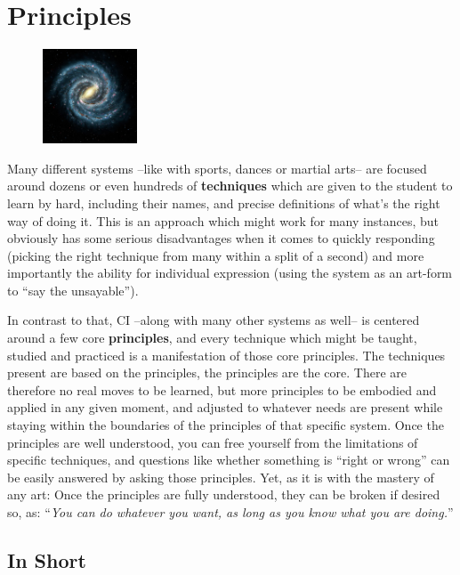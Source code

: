 \chapter{Principles}\label{ch:principles}

\begin{figure}
    \centering
    \includegraphics[width=0.25\textwidth]{images/principles}
\end{figure}

Many different systems --like with sports, dances or martial arts-- are focused around dozens or even hundreds of \textbf{techniques} which are given to the student to learn by hard, including their names, and precise definitions of what's the right way of doing it.
This is an approach which might work for many instances, but obviously has some serious disadvantages when it comes to quickly responding (picking the right technique from many within a split of a second) and more importantly the ability for individual expression (using the system as an art-form to ``say the unsayable'').

In contrast to that, CI --along with many other systems as well-- is centered around a few core \textbf{principles}, and every technique which might be taught, studied and practiced is a manifestation of those core principles.
The techniques present are based on the principles, the principles are the core.
There are therefore no real moves to be learned, but more principles to be embodied and applied in any given moment, and adjusted to whatever needs are present while staying within the boundaries of the principles of that specific system.
Once the principles are well understood, you can free yourself from the limitations of specific techniques, and questions like whether something is ``right or wrong'' can be easily answered by asking those principles.
Yet, as it is with the mastery of any art: Once the principles are fully understood, they can be broken if desired so, as: ``\textit{You can do whatever you want, as long as you know what you are doing.}''

\section{In Short}\label{sec:in-short}

